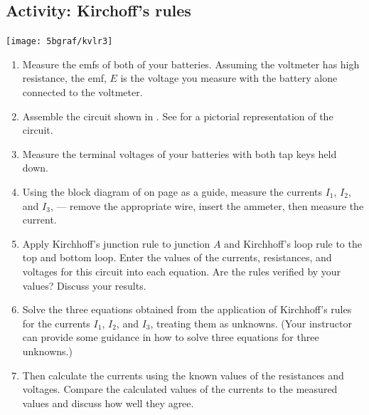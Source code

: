 \begin{multicols}{2}
\subsection{Activity: Kirchoff's rules}

\begin{center}
	\texttt{[image: 5bgraf/kvlr3]}	 %
	\label{f:kvlr3}
\end{center}

\begin{enumerate}
	 \item Measure the emfs of both of your batteries.  Assuming the voltmeter has high resistance, the emf, $E$ is the voltage you measure with the battery alone connected to the voltmeter.
	\item Assemble the circuit shown in .
	See  for a pictorial representation of the circuit.
	\item Measure the terminal voltages of your batteries with both tap keys held down.
	\item Using the block diagram of  on page \pageref{f:circboard} as a guide, measure the currents $I_1$, $I_2$, and $I_3$, --- remove the appropriate wire, insert the ammeter, then measure the current.
	\item Apply Kirchhoff's junction rule to junction $A$ and Kirchhoff's loop rule to the top and bottom loop.  Enter the values of the currents, resistances, and voltages for this circuit into each equation.  Are the rules verified by your values? Discuss your results.
	\item Solve the three equations obtained from the application of Kirchhoff's rules for the currents $I_1$, $I_2$, and $I_3$, treating them as unknowns. (Your instructor can provide some guidance in how to solve three equations for three unknowns.)
	\item Then calculate the currents using the known values of the resistances and voltages.  Compare the calculated values of the currents to the measured values and discuss how well they agree. 
\end{enumerate}

%
\end{multicols}

